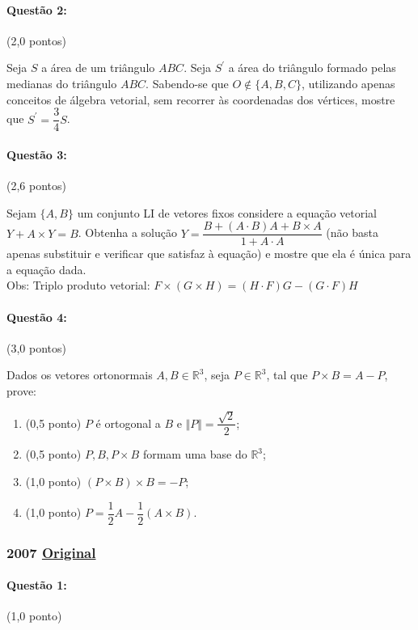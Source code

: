 \documentclass[12pt,a4paper]{article}
\newcommand{\original}[1]{\tiny \href{#1}{Original} \normalsize}
\begin{document}
\paragraph{Questão 2:} (2,0 pontos)

Seja $S$ a área de um triângulo $ABC$. Seja $S^\prime$ a área do triângulo formado pelas medianas do triângulo $ABC$. Sabendo-se que $O \notin \{A,B,C\}$, utilizando apenas conceitos de álgebra vetorial, sem recorrer às coordenadas dos vértices, mostre que $S^\prime = \dfrac{3}{4} S$.

\paragraph{Questão 3:} (2,6 pontos) 

Sejam $\{A,B\}$ um conjunto LI de vetores fixos considere a equação vetorial $Y + A\times Y = B$. Obtenha a solução $Y=\dfrac{B+(A\cdot B)A+B\times A}{1+A\cdot A}$ (não basta apenas substituir e verificar que satisfaz à equação) e mostre que ela é única para a equação dada.\\
Obs: Triplo produto vetorial: $F\times(G\times H) = (H\cdot F)G-(G\cdot F)H$

\paragraph{Questão 4:} (3,0 pontos) 

Dados os vetores ortonormais $A,B \in \mathbb{R}^3$, seja $P \in \mathbb{R}^3$, tal que $P \times B = A-P$, prove: 

\begin{enumerate}[label=(\alph*)]
\item (0,5 ponto) $P$ é ortogonal a $B$ e $\Vert P \Vert = \dfrac{\sqrt{2}}{2}$;
\item (0,5 ponto) $P,B,P\times B$ formam uma base do $\mathbb{R}^3$;
\item (1,0 ponto) $(P\times B)\times B = -P$;
\item (1,0 ponto) $P= \dfrac{1}{2}A - \dfrac{1}{2}(A\times B)$.
\end{enumerate}

\newpage
\subsubsection{2007 \original{https://drive.google.com/file/d/12NsjV4j1-xoKaBbTUO5W_yfG6VT9IGRH/view?usp=sharing}}

\paragraph{Questão 1:} (1,0 ponto)
\end{document}
